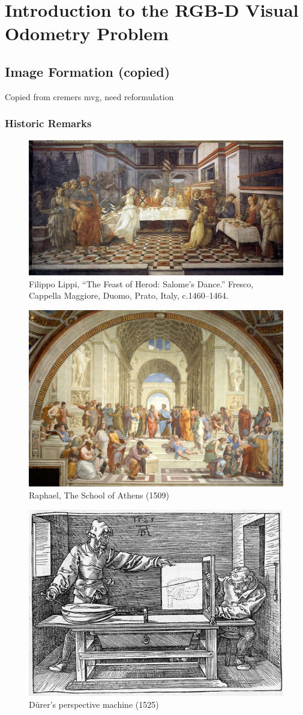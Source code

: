 \chapter{Introduction to the RGB-D Visual Odometry Problem}%
\label{cha:rgbd_vo}

\minitoc%
\clearpage

\section{Image Formation (copied)}%
\label{sec:image-formation}

\alert{Copied from cremers mvg, need reformulation}

\subsection{Historic Remarks}%
\label{sub:historic_remarks}


\begin{figure}[h]
\centering
\includegraphics[width=0.5\columnwidth]{assets/img/lippi_feast_herod.jpg}
\caption{Filippo Lippi, ``The Feast of Herod: Salome's Dance.''
Fresco, Cappella Maggiore, Duomo, Prato, Italy, c.1460--1464.}%
\label{fig:lippi_feast_herod}
\end{figure}

\begin{figure}[h]
\centering
\includegraphics[width=0.5\columnwidth]{assets/img/raphael_school_athens.jpg}
\caption{Raphael, The School of Athens (1509)}%
\label{fig:raphael_school_athens}
\end{figure}

\begin{figure}[h]
\centering
\includegraphics[width=0.5\columnwidth]{assets/img/durer_perspective_machine.jpg}
\caption{D\"urer's perspective machine (1525)}%
\label{fig:durer_perspective_machine}
\end{figure}

